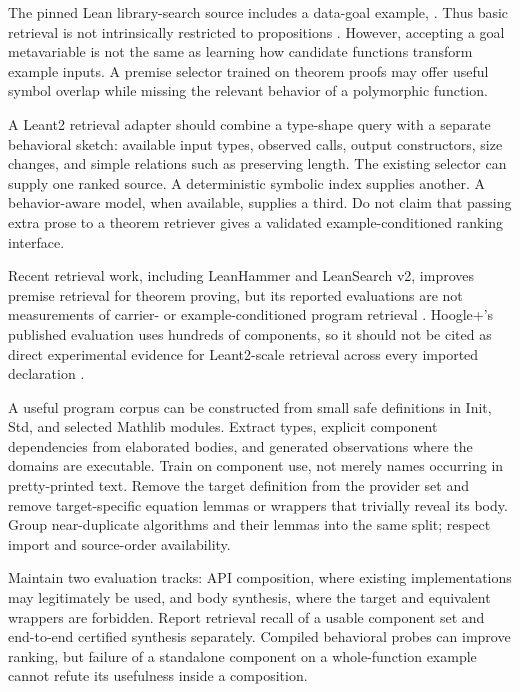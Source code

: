 
The pinned Lean library-search source includes a data-goal example,
. Thus basic retrieval is not intrinsically
restricted to propositions \cite{librarysearch}. However, accepting a goal
metavariable is not the same as learning how candidate functions transform
example inputs. A premise selector trained on theorem proofs may offer useful
symbol overlap while missing the relevant behavior of a polymorphic function.

A Leant2 retrieval adapter should combine a type-shape query with a separate
behavioral sketch: available input types, observed calls, output constructors,
size changes, and simple relations such as preserving length. The existing
selector can supply one ranked source. A deterministic symbolic index supplies
another. A behavior-aware model, when available, supplies a third. Do not claim
that passing extra prose to a theorem retriever gives a validated
example-conditioned ranking interface.

Recent retrieval work, including LeanHammer and LeanSearch v2, improves
premise retrieval for theorem proving, but its reported evaluations are not
measurements of carrier- or example-conditioned program retrieval
\cite{leanhammer,leansearch}. Hoogle+'s published evaluation uses hundreds of
components, so it should not be cited as direct experimental evidence for
Leant2-scale retrieval across every imported declaration \cite{hoogleplus}.

A useful program corpus can be constructed from small safe definitions in
Init, Std, and selected Mathlib modules. Extract types, explicit component
dependencies from elaborated bodies, and generated observations where the
domains are executable. Train on component use, not merely names occurring in
pretty-printed text. Remove the target definition from the provider set and
remove target-specific equation lemmas or wrappers that trivially reveal its
body. Group near-duplicate algorithms and their lemmas into the same split;
respect import and source-order availability.

Maintain two evaluation tracks: API composition, where existing implementations
may legitimately be used, and body synthesis, where the target and equivalent
wrappers are forbidden. Report retrieval recall of a usable component set and
end-to-end certified synthesis separately. Compiled behavioral probes can
improve ranking, but failure of a standalone component on a whole-function
example cannot refute its usefulness inside a composition.
